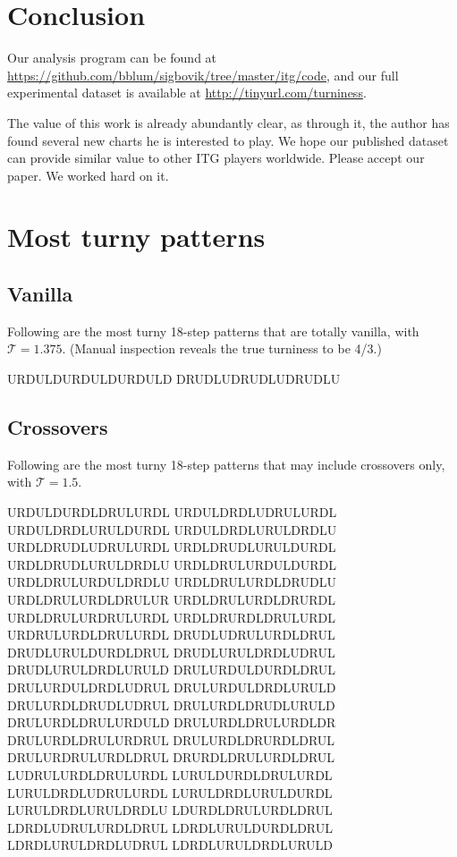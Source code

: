 \documentclass[10pt]{sigplanconf}
\begin{document}
\section{Conclusion}

Our analysis program can be found at \url{https://github.com/bblum/sigbovik/tree/master/itg/code}, and our full experimental dataset is available at \url{http://tinyurl.com/turniness}.

The value of this work is already abundantly clear, as through it, the author has found several new charts he is interested to play. We hope our published dataset can provide similar value to other ITG players worldwide.
Please accept our paper.
We worked hard on it.


\appendix

\section{Most turny patterns}


\subsection{Vanilla}

Following are the most turny 18-step patterns that are totally vanilla, with $\mathcal{T}=1.375$. (Manual inspection reveals the true turniness to be 4/3.)

\noindent
URDULDURDULDURDULD
DRUDLUDRUDLUDRUDLU

\subsection{Crossovers}

Following are the most turny 18-step patterns that may include crossovers only, with $\mathcal{T}=1.5$.

\noindent
URDULDURDLDRULURDL
URDULDRDLUDRULURDL
URDULDRDLURULDURDL
URDULDRDLURULDRDLU
URDLDRUDLUDRULURDL
URDLDRUDLURULDURDL
URDLDRUDLURULDRDLU
URDLDRULURDULDURDL
URDLDRULURDULDRDLU
URDLDRULURDLDRUDLU
URDLDRULURDLDRULUR
URDLDRULURDLDRURDL
URDLDRULURDRULURDL
URDLDRURDLDRULURDL
URDRULURDLDRULURDL
DRUDLUDRULURDLDRUL
DRUDLURULDURDLDRUL
DRUDLURULDRDLUDRUL
DRUDLURULDRDLURULD
DRULURDULDURDLDRUL
DRULURDULDRDLUDRUL
DRULURDULDRDLURULD
DRULURDLDRUDLUDRUL
DRULURDLDRUDLURULD
DRULURDLDRULURDULD
DRULURDLDRULURDLDR
DRULURDLDRULURDRUL
DRULURDLDRURDLDRUL
DRULURDRULURDLDRUL
DRURDLDRULURDLDRUL
LUDRULURDLDRULURDL
LURULDURDLDRULURDL
LURULDRDLUDRULURDL
LURULDRDLURULDURDL
LURULDRDLURULDRDLU
LDURDLDRULURDLDRUL
LDRDLUDRULURDLDRUL
LDRDLURULDURDLDRUL
LDRDLURULDRDLUDRUL
LDRDLURULDRDLURULD
\end{document}
